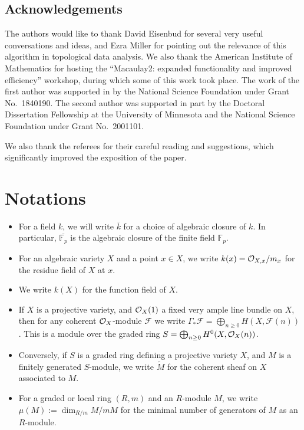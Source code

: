 \documentclass[12pt]{article}
\let\wtilde\widetilde
\def\cF{\mathcal F}
\theoremstyle{theorem}
\numberwithin{thm}{section}
\theoremstyle{definition}
\begin{document}
\subsection*{Acknowledgements}
The authors would like to thank David Eisenbud for several very useful conversations and ideas, and Ezra Miller for pointing out the relevance of this algorithm in topological data analysis.
We also thank the American Institute of Mathematics for hosting the ``Macaulay2: expanded functionality and improved efficiency'' workshop, during which some of this work took place.
The work of the first author was supported in by the National Science Foundation under Grant No.~1840190.
The second author was supported in part by the Doctoral Dissertation Fellowship at the University of Minnesota and the National Science Foundation under Grant No.~2001101.

We also thank the referees for their careful reading and suggestions, which significantly improved the exposition of the paper.


\section{Notations}

\begin{itemize}
\item For a field $k$, we will write $\overline k$ for a choice of algebraic closure of $k$. In particular, $\overline{\mathbb F_p}$ is the algebraic closure of the finite field $\mathbb F_p$.
\item For an algebraic variety $X$ and a point $x\in X$, we write $k(x)=\mathcal O_{X,x}/m_x$ for the residue field of $X$ at $x$.
\item We write $k(X)$ for the function field of $X$.
\item If $X$ is a projective variety, and $\mathcal O_X(1)$ a fixed very ample line bundle on $X$, then for any coherent $\mathcal O_X$-module $\cF$ we write 
$\Gamma_* \cF = \bigoplus_{n\geq 0} H(X,\cF(n))$. This is a module over the graded ring $S=\bigoplus_{n\geq 0} H^0(X,\mathcal O_X(n))$.
\item Conversely, if $S$ is a graded ring defining a projective variety $X$, and $M$ is a finitely generated $S$-module, we write $\wtilde M$ for the coherent sheaf on $X$ associated to $M$.
\item For a graded or local ring $(R,m)$ and an $R$-module $M$, we write $\mu(M):=\dim_{R/m} M/mM$ for the minimal number of generators of $M$ as an $R$-module.
\end{itemize}
\end{document}
